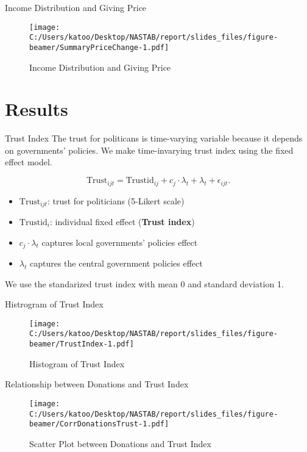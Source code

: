 \documentclass[
  ignorenonframetext,
]{beamer}
\providecommand{\tightlist}{%
  \setlength{\itemsep}{0pt}\setlength{\parskip}{0pt}}
\begin{document}
\begin{frame}{Income Distribution and Giving Price}
\protect\hypertarget{income-distribution-and-giving-price}{}
\begin{figure}
\centering
\texttt{[image: C:/Users/katoo/Desktop/NASTAB/report/slides\_files/figure-beamer/SummaryPriceChange-1.pdf]}
\caption{Income Distribution and Giving Price}
\end{figure}
\end{frame}

\hypertarget{results}{%
\section{Results}\label{results}}

\begin{frame}{Trust Index}
\protect\hypertarget{trust-index}{}
The trust for politicans is time-varying variable because it depends on
governments' policies. We make time-invarying trust index using the
fixed effect model.

\[
    \text{Trust}_{ijt} = \text{Trustid}_{ij} + c_j \cdot \lambda_t + \lambda_t + \epsilon_{ijt}.
\]

\begin{itemize}
\tightlist
\item
  \(\text{Trust}_{ijt}\): trust for politicians (5-Likert scale)
\item
  \(\text{Trustid}_i\): individual fixed effect (\textbf{Trust index})
\item
  \(c_j \cdot \lambda_t\) captures local governments' policies effect
\item
  \(\lambda_t\) captures the central government policies effect
\end{itemize}

We use the standarized trust index with mean 0 and standard deviation 1.
\end{frame}

\begin{frame}{Histrogram of Trust Index}
\protect\hypertarget{histrogram-of-trust-index}{}
\begin{figure}
\centering
\texttt{[image: C:/Users/katoo/Desktop/NASTAB/report/slides\_files/figure-beamer/TrustIndex-1.pdf]}
\caption{Histogram of Trust Index}
\end{figure}
\end{frame}

\begin{frame}{Relationship between Donations and Trust Index}
\protect\hypertarget{relationship-between-donations-and-trust-index}{}
\begin{figure}
\centering
\texttt{[image: C:/Users/katoo/Desktop/NASTAB/report/slides\_files/figure-beamer/CorrDonationsTrust-1.pdf]}
\caption{Scatter Plot between Donations and Trust Index}
\end{figure}
\end{frame}
\end{document}
